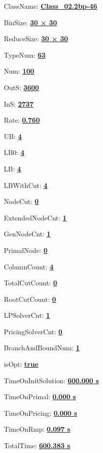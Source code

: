 \documentclass[11pt]{article}
\begin{document}
\pagestyle{empty}


ClassName: \underline{\textbf{Class_02.2bp-46}}
\par
BinSize: \underline{\textbf{30 × 30}}
\par
ReduceSize: \underline{\textbf{30 × 30}}
\par
TypeNum: \underline{\textbf{63}}
\par
Num: \underline{\textbf{100}}
\par
OutS: \underline{\textbf{3600}}
\par
InS: \underline{\textbf{2737}}
\par
Rate: \underline{\textbf{0.760}}
\par
UB: \underline{\textbf{4}}
\par
LB0: \underline{\textbf{4}}
\par
LB: \underline{\textbf{4}}
\par
LBWithCut: \underline{\textbf{4}}
\par
NodeCut: \underline{\textbf{0}}
\par
ExtendedNodeCnt: \underline{\textbf{1}}
\par
GenNodeCnt: \underline{\textbf{1}}
\par
PrimalNode: \underline{\textbf{0}}
\par
ColumnCount: \underline{\textbf{4}}
\par
TotalCutCount: \underline{\textbf{0}}
\par
RootCutCount: \underline{\textbf{0}}
\par
LPSolverCnt: \underline{\textbf{1}}
\par
PricingSolverCnt: \underline{\textbf{0}}
\par
BranchAndBoundNum: \underline{\textbf{1}}
\par
isOpt: \underline{\textbf{true}}
\par
TimeOnInitSolution: \underline{\textbf{600.000 s}}
\par
TimeOnPrimal: \underline{\textbf{0.000 s}}
\par
TimeOnPricing: \underline{\textbf{0.000 s}}
\par
TimeOnRmp: \underline{\textbf{0.097 s}}
\par
TotalTime: \underline{\textbf{600.383 s}}
\par
\newpage
\end{document}
